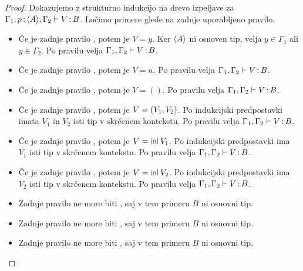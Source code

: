 \begin{proof}
	Dokazujemo z strukturno indukcijo na drevo izpeljave za $\Gamma_1, p \mathinner{:} \langle A \rangle, \Gamma_2 \vdash V \mathinner{:} B$.
	Ločimo primere glede na zadnje uporabljeno pravilo.
	
	\begin{itemize}
		\item[\sitem] Če je zadnje pravilo , potem je $V = y$. Ker $\langle A \rangle$ ni osnoven tip, velja $y \in \Gamma_1$ ali $y \in \Gamma_2$.
		Po pravilu  velja $\Gamma_1, \Gamma_2 \vdash V \mathinner{:} B$.
		
		\item Če je zadnje pravilo , potem je $V = n$. Po pravilu  velja $\Gamma_1, \Gamma_2 \vdash V \mathinner{:} B$.
		
		\item Če je zadnje pravilo , potem je $V = ()$. Po pravilu  velja $\Gamma_1, \Gamma_2 \vdash V \mathinner{:} B$.
		
		\item Če je zadnje pravilo , potem je $V =( V_1 , V_2 )$.
		Po indukcijski predpostavki imata $V_1$ in $V_2$ isti tip v skrčenem kontekstu.
		Po pravilu  velja $\Gamma_1, \Gamma_2 \vdash V \mathinner{:} B$.
		
		
		\item Če je zadnje pravilo , potem je $V = \tminl{V_1}$.
		Po indukcijski predpostavki ima $V_1$ isti tip v skrčenem kontekstu.
		Po pravilu  velja $\Gamma_1, \Gamma_2 \vdash V \mathinner{:} B$.
		
		\item Če je zadnje pravilo , potem je $V = \tminl{V_2}$.
		Po indukcijski predpostavki ima $V_2$ isti tip v skrčenem kontekstu.
		Po pravilu  velja $\Gamma_1, \Gamma_2 \vdash V \mathinner{:} B$.
		
		\item Zadnje pravilo ne more biti , saj v tem primeru $B$ ni osnovni tip.
		
		\item Zadnje pravilo ne more biti , saj v tem primeru $B$ ni osnovni tip.
		
		\item Zadnje pravilo ne more biti , saj v tem primeru $B$ ni osnovni tip.
		
	\end{itemize}
\end{proof}

